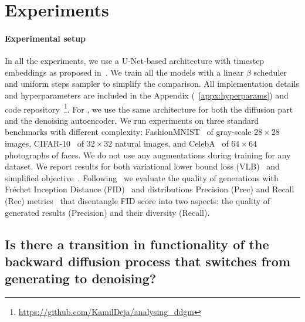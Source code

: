 \section{Experiments}


\paragraph{Experimental setup} In all the experiments, we use a U-Net-based architecture with timestep embeddings as proposed in~\cite{ho2020denoising,nichol2021improved}. We train all the models with a linear $\beta$ scheduler and uniform steps sampler to simplify the comparison. All implementation details and hyperparameters are included in the Appendix (~\ref{appx:hyperparams}) and code repository~\footnote{\url{https://github.com/KamilDeja/analysing_ddgm}}. 
For \ours{}, we use the same architecture for both the diffusion part and the denoising autoencoder. 
We run experiments on three standard benchmarks with different complexity: FashionMNIST~\cite{xiao2017fashion} of gray-scale $28 \times 28$ images, CIFAR-10~\cite{Krizhevsky09learningmultiple} of $32 \times 32$ natural images, and CelebA~\cite{liu2015faceattributes} of $64 \times 64$ photographs of faces. We do not use any augmentations during training for any dataset. We report results for both variational lower bound loss (VLB)~\cite{sohl2015deep} and simplified objective~\cite{ho2020denoising}.
Following~\cite{nichol2021improved} we evaluate the quality of generations with Fréchet Inception Distance (FID)~\cite{heusel2017gans} and distributions Precision (Prec) and Recall (Rec) metrics~\cite{sajjadi2018assessing} that disentangle FID score into two aspects: the quality of generated results (Precision) and their diversity (Recall).

\subsection{Is there a transition in functionality of the backward diffusion process that switches from generating to denoising?}
\label{sect:reasonable_to_use_denoiser}


